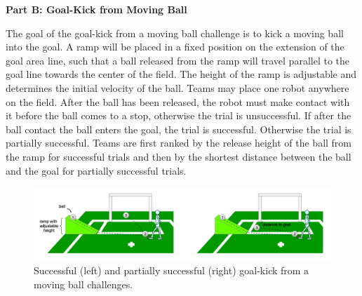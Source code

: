 \clearpage
\sffamily
{\bfseries\color[rgb]{0.4,0.4,0.4}
Part B: Goal-Kick from Moving Ball}

\bigskip

The goal of the goal-kick from a moving ball challenge is to kick a moving ball into the goal. A ramp will be placed in a fixed position on the extension of the goal area line, such that a ball released from the ramp will travel parallel to the goal line towards the center of the field. The height of the ramp is adjustable and determines the initial velocity of the ball. Teams may place one robot anywhere on the field. After the ball has been released, the robot must make contact with it before the ball comes to a stop, otherwise the trial is unsuccessful.
If after the ball contact the ball enters the goal, the trial is successful. Otherwise the trial is partially successful. Teams are first ranked by the release height of the ball from the ramp for successful trials and then by the shortest distance between the ball and the goal for partially successful trials.


\begin{figure}[h]
\begin{center}
\includegraphics[width=\textwidth]{img/moving-ball.png}
\caption{Successful (left) and partially successful (right) goal-kick from a moving ball challenges.}
\end{center}
\end{figure}